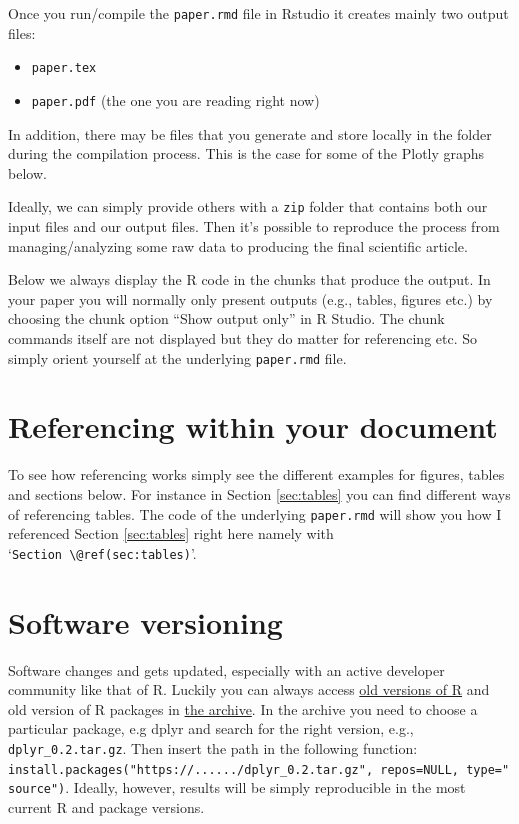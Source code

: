 \documentclass[12pt,]{article}
\providecommand{\tightlist}{%
  \setlength{\itemsep}{0pt}\setlength{\parskip}{0pt}}
\theoremstyle{definition}
\theoremstyle{definition}
\theoremstyle{definition}
\theoremstyle{remark}
\begin{document}
Once you run/compile the \texttt{paper.rmd} file in Rstudio it creates
mainly two output files:

\begin{itemize}
\tightlist
\item
  \texttt{paper.tex}
\item
  \texttt{paper.pdf} (the one you are reading right now)
\end{itemize}

In addition, there may be files that you generate and store locally in
the folder during the compilation process. This is the case for some of
the Plotly graphs below.

Ideally, we can simply provide others with a \texttt{zip} folder that
contains both our input files and our output files. Then it's possible
to reproduce the process from managing/analyzing some raw data to
producing the final scientific article.

Below we always display the R code in the chunks that produce the
output. In your paper you will normally only present outputs (e.g.,
tables, figures etc.) by choosing the chunk option ``Show output only''
in R Studio. The chunk commands itself are not displayed but they do
matter for referencing etc. So simply orient yourself at the underlying
\texttt{paper.rmd} file.

\section{Referencing within your
document}\label{referencing-within-your-document}

To see how referencing works simply see the different examples for
figures, tables and sections below. For instance in Section
\ref{sec:tables} you can find different ways of referencing tables. The
code of the underlying \texttt{paper.rmd} will show you how I referenced
Section \ref{sec:tables} right here namely with
`\texttt{Section\ \textbackslash{}@ref(sec:tables)}'.

\section{Software versioning}\label{software-versioning}

Software changes and gets updated, especially with an active developer
community like that of R. Luckily you can always access
\href{https://cran.r-project.org/bin/windows/base/old/}{old versions of
R} and old version of R packages in
\href{https://cran.r-project.org/src/contrib/Archive/}{the archive}. In
the archive you need to choose a particular package, e.g dplyr and
search for the right version, e.g., \texttt{dplyr\_0.2.tar.gz}. Then
insert the path in the following function:
\texttt{install.packages("https://....../dplyr\_0.2.tar.gz",\ repos=NULL,\ type="source")}.
Ideally, however, results will be simply reproducible in the most
current R and package versions.
\end{document}
